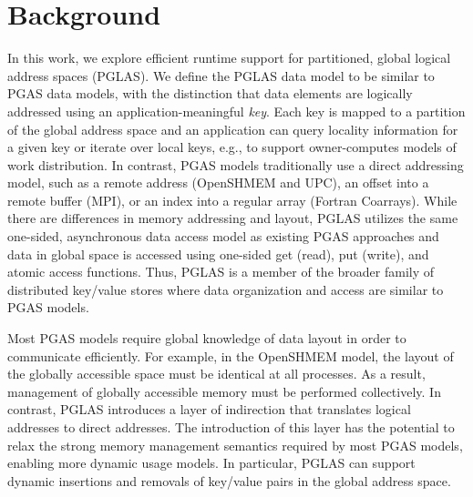 \section{Background}

In this work, we explore efficient runtime support for partitioned,
global logical address spaces (PGLAS).  We define the PGLAS data model
to be similar to PGAS data models, with the distinction that data
elements are logically addressed using an application-meaningful {\em
  key}.  Each key is mapped to a partition of the global address space
and an application can query locality information for a given key or
iterate over local keys, e.g., to support owner-computes models of
work distribution.  In contrast, PGAS models traditionally use a
direct addressing model, such as a remote address (OpenSHMEM and UPC),
an offset into a remote buffer (MPI), or an index into a regular array
(Fortran Coarrays).  While there are differences in memory addressing
and layout, PGLAS utilizes the same one-sided, asynchronous data
access model as existing PGAS approaches and data in global space is
accessed using one-sided get (read), put (write), and atomic access
functions.  Thus, PGLAS is a member of the broader family of
distributed key/value stores where data organization and access are
similar to PGAS models.

Most PGAS models require global knowledge of data layout in order to
communicate efficiently.  For example, in the OpenSHMEM model, the layout of
the globally accessible space must be identical at all processes.  As a result,
management of globally accessible memory must be performed collectively.  In
contrast, PGLAS introduces a layer of indirection that translates logical
addresses to direct addresses.  The introduction of this layer
has the potential to relax the strong memory management semantics required by
most PGAS models, enabling more dynamic usage models.  In particular, PGLAS can
support dynamic insertions and removals of key/value pairs in the global
address space.

